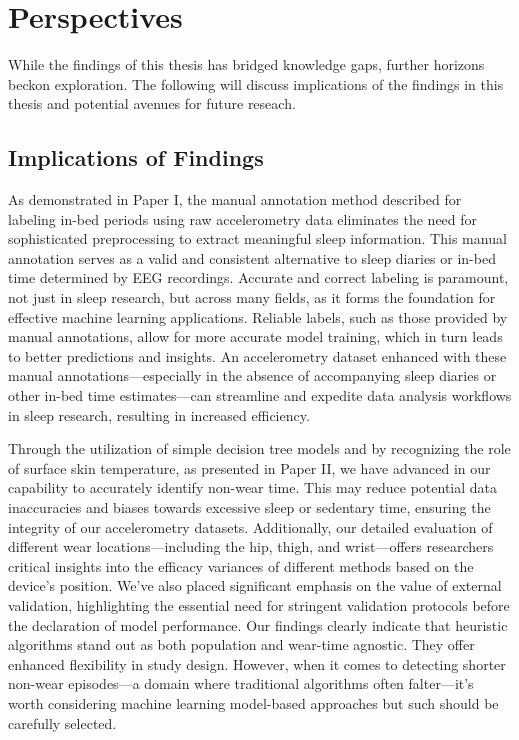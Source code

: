 \documentclass[
  10pt,
]{scrbook}
\begin{document}
\hypertarget{perspectives}{%
\chapter{Perspectives}\label{perspectives}}

While the findings of this thesis has bridged knowledge gaps, further
horizons beckon exploration. The following will discuss implications of
the findings in this thesis and potential avenues for future reseach.

\hypertarget{implications-of-findings}{%
\section{Implications of Findings}\label{implications-of-findings}}

As demonstrated in Paper I, the manual annotation method described for
labeling in-bed periods using raw accelerometry data eliminates the need
for sophisticated preprocessing to extract meaningful sleep information.
This manual annotation serves as a valid and consistent alternative to
sleep diaries or in-bed time determined by EEG recordings. Accurate and
correct labeling is paramount, not just in sleep research, but across
many fields, as it forms the foundation for effective machine learning
applications. Reliable labels, such as those provided by manual
annotations, allow for more accurate model training, which in turn leads
to better predictions and insights. An accelerometry dataset enhanced
with these manual annotations---especially in the absence of
accompanying sleep diaries or other in-bed time estimates---can
streamline and expedite data analysis workflows in sleep research,
resulting in increased efficiency.

Through the utilization of simple decision tree models and by
recognizing the role of surface skin temperature, as presented in Paper
II, we have advanced in our capability to accurately identify non-wear
time. This may reduce potential data inaccuracies and biases towards
excessive sleep or sedentary time, ensuring the integrity of our
accelerometry datasets. Additionally, our detailed evaluation of
different wear locations---including the hip, thigh, and wrist---offers
researchers critical insights into the efficacy variances of different
methods based on the device's position. We've also placed significant
emphasis on the value of external validation, highlighting the essential
need for stringent validation protocols before the declaration of model
performance. Our findings clearly indicate that heuristic algorithms
stand out as both population and wear-time agnostic. They offer enhanced
flexibility in study design. However, when it comes to detecting shorter
non-wear episodes---a domain where traditional algorithms often
falter---it's worth considering machine learning model-based approaches
but such should be carefully selected.
\end{document}
